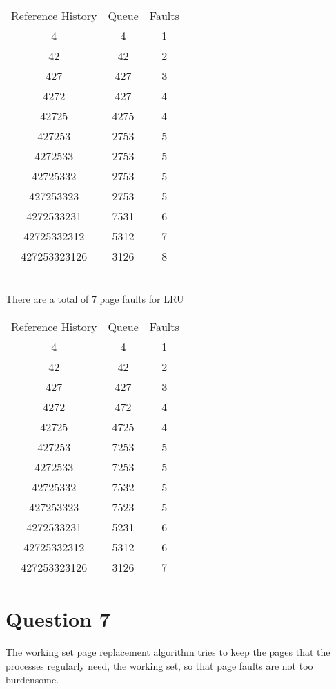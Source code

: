 \documentclass{article}
\begin{document}
\begin{tabular}{c c c}
    Reference History & Queue & Faults\\
    4 & 4 & 1 \\
    42 & 42 & 2 \\
    427 & 427 & 3 \\
    4272 & 427 & 4 \\
    42725 & 4275 & 4 \\
    427253 & 2753 & 5 \\
    4272533 & 2753 & 5 \\
    42725332 & 2753 & 5 \\
    427253323 & 2753 & 5 \\
    4272533231 & 7531 & 6 \\
    42725332312 & 5312 & 7 \\
    427253323126 & 3126 & 8
\end{tabular} \\

There are a total of 7 page faults for LRU

\begin{tabular}{c c c}
    Reference History & Queue &Faults\\
    4 & 4 & 1 \\
    42 & 42 & 2 \\
    427 & 427 & 3 \\
    4272 & 472  & 4 \\
    42725 & 4725 & 4 \\
    427253 & 7253 & 5 \\
    4272533 & 7253 & 5 \\
    42725332 & 7532 & 5 \\
    427253323 & 7523 & 5 \\
    4272533231 & 5231 & 6 \\
    42725332312 & 5312 & 6 \\
    427253323126 & 3126 & 7
\end{tabular}

\section*{Question 7}
The working set page replacement algorithm tries
to keep the pages that the processes regularly need, the working set,
so that page faults are not too burdensome.
\end{document}
